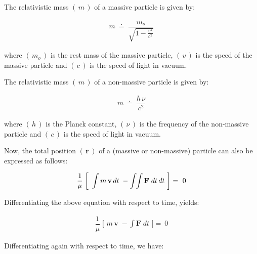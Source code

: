 \documentclass[10pt,fleqn]{article}
\begin{document}
\newpage

\noindent The relativistic mass $( \, m \, )$ of a massive particle is given by:
\par \vspace{-0.60em}
\begin{eqnarray*}
m ~\doteq~ \dfrac{m_o}{\sqrt{1 - \frac{v^2}{c^2}}}
\end{eqnarray*}
\par \vspace{+0.45em}
\noindent where $( \, m_o \, )$ is the rest mass of the massive particle, $( \, v \, )$ is the speed of the massive particle and $( \, c \, )$ is the speed of light in vacuum.
\par \vspace{+0.60em}
\noindent The relativistic mass $( \, m \, )$ of a non-massive particle is given by:
\par \vspace{-0.60em}
\begin{eqnarray*}
m ~\doteq~ \dfrac{h \, \nu}{c^2}
\end{eqnarray*}
\par \vspace{+0.45em}
\noindent where $( \, h \, )$ is the Planck constant, $( \, \nu \, )$ is the frequency of the non-massive particle and $( \, c \, )$ is the speed of light in vacuum.
\par \vspace{+0.75em}
\noindent Now, the total position $( \, \bar{\mathbf{r}} \, )$ of a (massive or non-massive) particle can also be expressed as follows:
\par \vspace{-0.60em}
\begin{eqnarray*}
\dfrac{1}{\mu} \; \bigg [ \,\, \int m \, \mathbf{v} \, dt \; - \int \hspace{-0.30em} \int \mathbf{F} \; dt \, dt \,\, \bigg ] =~ 0
\end{eqnarray*}
\par \vspace{+0.60em}
\noindent Differentiating the above equation with respect to time, yields:
\par \vspace{-0.60em}
\begin{eqnarray*}
\dfrac{1}{\mu} \; \bigg [ \,\, m \, \mathbf{v} \; - \int \mathbf{F} \; dt \,\, \bigg ] =~ 0
\end{eqnarray*}
\par \vspace{+0.60em}
\noindent Differentiating again with respect to time, we have:
\end{document}
